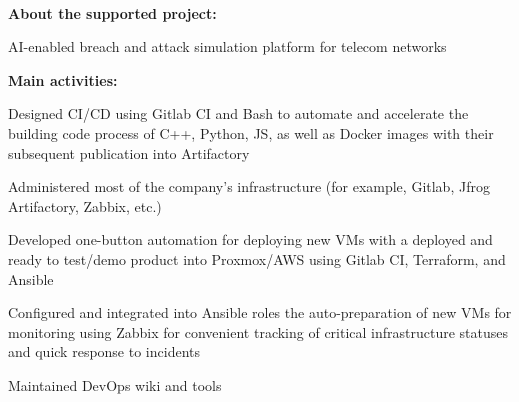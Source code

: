 \documentclass[a4paper]{MagicalCV}
\begin{document}
\begin{minipage}[t]{0.64\textwidth} 


 \\
\vspace{\topsep} %
\textbf{About the supported project:}
\begin{tightemize}
  \item AI-enabled breach and attack simulation platform for telecom networks
\end{tightemize}
\textbf{Main activities:}
\begin{tightemize}
  \item Designed CI/CD using Gitlab CI and Bash to automate and accelerate the building code process of C++, Python, JS, as well as Docker images with their subsequent publication into Artifactory
  \item Administered most of the company's infrastructure (for example, Gitlab, Jfrog Artifactory, Zabbix, etc.)
  \item Developed one-button automation for deploying new VMs with a deployed and ready to test/demo product into Proxmox/AWS using Gitlab CI, Terraform, and Ansible
  \item Configured and integrated into Ansible roles the auto-preparation of new VMs for monitoring using Zabbix for convenient tracking of critical infrastructure statuses and quick response to incidents
  \item Maintained DevOps wiki and tools
\end{tightemize}
\sectionsep


\end{minipage}
\end{document}
